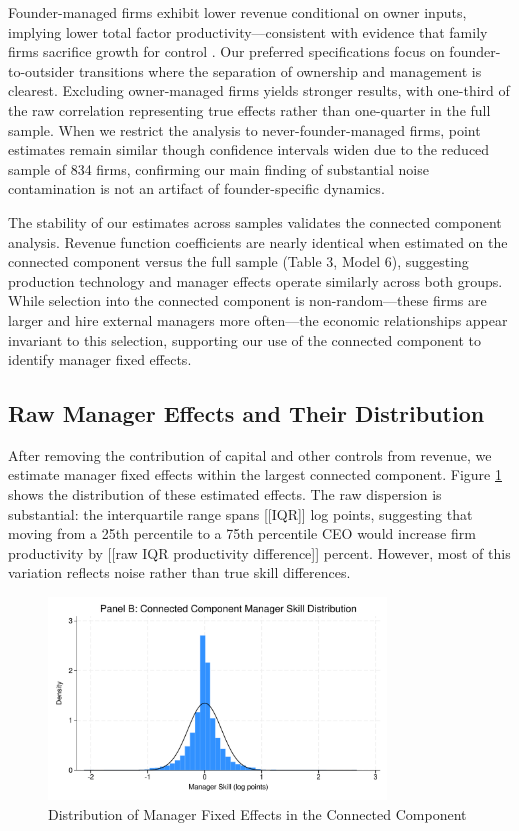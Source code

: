 \documentclass[11pt,a4paper]{article}
\begin{document}
Founder-managed firms exhibit lower revenue conditional on owner inputs, implying lower total factor productivity—consistent with evidence that family firms sacrifice growth for control \citep{bennedsen2007inside}. Our preferred specifications focus on founder-to-outsider transitions where the separation of ownership and management is clearest. Excluding owner-managed firms yields stronger results, with one-third of the raw correlation representing true effects rather than one-quarter in the full sample. When we restrict the analysis to never-founder-managed firms, point estimates remain similar though confidence intervals widen due to the reduced sample of 834 firms, confirming our main finding of substantial noise contamination is not an artifact of founder-specific dynamics.




The stability of our estimates across samples validates the connected component analysis. Revenue function coefficients are nearly identical when estimated on the connected component versus the full sample (Table 3, Model 6), suggesting production technology and manager effects operate similarly across both groups. While selection into the connected component is non-random—these firms are larger and hire external managers more often—the economic relationships appear invariant to this selection, supporting our use of the connected component to identify manager fixed effects.

\subsection{Raw Manager Effects and Their Distribution}

After removing the contribution of capital and other controls from revenue, we estimate manager fixed effects within the largest connected component. Figure \ref{fig:manager_distribution} shows the distribution of these estimated effects. The raw dispersion is substantial: the interquartile range spans [[IQR]] log points, suggesting that moving from a 25th percentile to a 75th percentile CEO would increase firm productivity by [[raw IQR productivity difference]] percent. However, most of this variation reflects noise rather than true skill differences.

\begin{figure}[htbp]
\centering
\includegraphics[width=0.8\textwidth]{figure/manager_skill_connected.pdf}
\caption{Distribution of Manager Fixed Effects in the Connected Component}
\label{fig:manager_distribution}
\end{figure}
\end{document}
